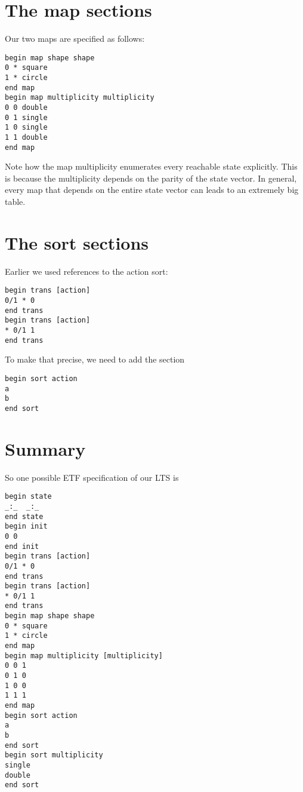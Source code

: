 \section{The map sections}

Our two maps are specified as follows:
\begin{verbatim}
begin map shape shape
0 * square
1 * circle
end map
begin map multiplicity multiplicity
0 0 double
0 1 single
1 0 single
1 1 double
end map
\end{verbatim}
Note how the map multiplicity enumerates every reachable state explicitly.
This is because the multiplicity depends on the parity of the state vector.
In general, every map that depends on the entire state vector can leads
to an extremely big table. 

\section{The sort sections}

Earlier we used references to the action sort:
\begin{verbatim}
begin trans [action]
0/1 * 0
end trans
begin trans [action]
* 0/1 1
end trans
\end{verbatim}
To make that precise, we need to add the section

\begin{verbatim}
begin sort action
a
b
end sort
\end{verbatim}

\section{Summary}

So one possible ETF specification of our LTS is

\begin{verbatim}
begin state
_:_  _:_
end state
begin init
0 0
end init
begin trans [action]
0/1 * 0
end trans
begin trans [action]
* 0/1 1
end trans
begin map shape shape
0 * square
1 * circle
end map
begin map multiplicity [multiplicity]
0 0 1
0 1 0
1 0 0
1 1 1
end map
begin sort action
a
b
end sort
begin sort multiplicity
single
double
end sort
\end{verbatim}


